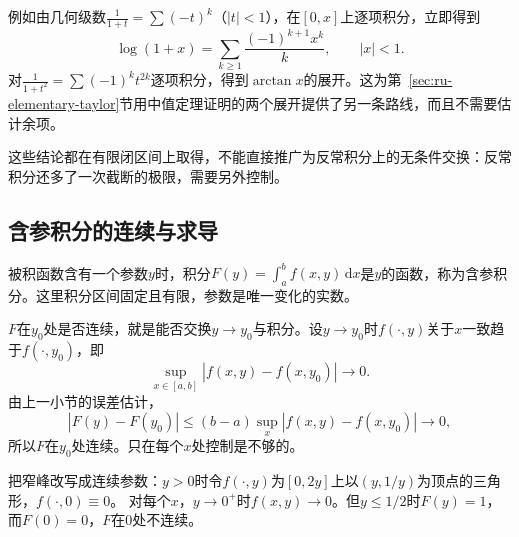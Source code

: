 例如由几何级数$\frac1{1+t}=\sum(-t)^k$（$|t|<1$），在$[0,x]$上逐项积分，立即得到
\[
 \log(1+x)=\sum_{k\geq1}\frac{(-1)^{k+1}x^k}k,\qquad|x|<1.
\]
对$\frac1{1+t^2}=\sum(-1)^kt^{2k}$逐项积分，得到$\arctan x$的展开。这为第~\ref{sec:ru-elementary-taylor}节用中值定理证明的两个展开提供了另一条路线，而且不需要估计余项。

这些结论都在有限闭区间上取得，不能直接推广为反常积分上的无条件交换：反常积分还多了一次截断的极限，需要另外控制。

\subsection{含参积分的连续与求导}
\label{sec:ru-parametric-integrals}

被积函数含有一个参数$y$时，积分$F(y)=\int_a^bf(x,y)\,\mathrm dx$是$y$的函数，称为含参积分。这里积分区间固定且有限，参数是唯一变化的实数。

$F$在$y_0$处是否连续，就是能否交换$y\to y_0$与积分。设$y\to y_0$时$f(\cdot,y)$关于$x$一致趋于$f(\cdot,y_0)$，即
\[
 \sup_{x\in[a,b]}|f(x,y)-f(x,y_0)|\to0.
\]
由上一小节的误差估计，
\[
 |F(y)-F(y_0)|\leq(b-a)\sup_x|f(x,y)-f(x,y_0)|\to0,
\]
所以$F$在$y_0$处连续。只在每个$x$处控制是不够的。

\begin{example}[逐点收敛而不连续的含参积分]
\label{ex:ru-parametric-narrow-spike}
把窄峰改写成连续参数：$y>0$时令$f(\cdot,y)$为$[0,2y]$上以$(y,1/y)$为顶点的三角形，$f(\cdot,0)\equiv0$。
对每个$x$，$y\to0^+$时$f(x,y)\to0$。但$y\leq1/2$时$F(y)=1$，而$F(0)=0$，$F$在$0$处不连续。
\end{example}

